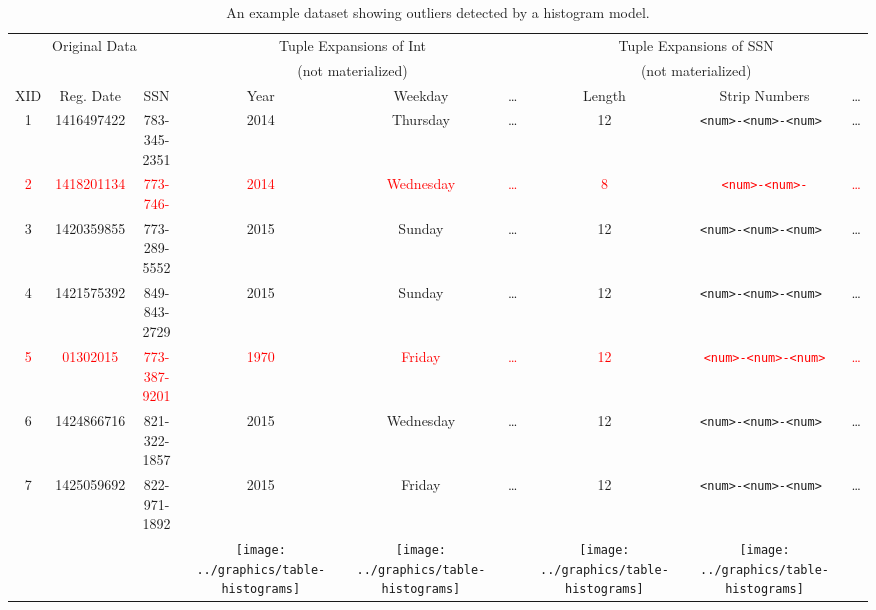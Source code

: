 \begin{table*}[t]
\begin{center}
\begin{tabular}{|c|c|c||c|c|c||c|c|c|}
\multicolumn{3}{c}{Original Data} & \multicolumn{3}{c}{Tuple Expansions of Int} & \multicolumn{3}{c}{Tuple Expansions of SSN} \\
\multicolumn{3}{c}{} & \multicolumn{3}{c}{(not materialized)} & \multicolumn{3}{c}{(not materialized)} \\
\hline
XID & Reg. Date & SSN & Year & Weekday & \ldots & Length & Strip Numbers & \ldots \\ \hline
\hline
1 & 1416497422 & 783-345-2351 & 2014 & Thursday &\ldots& 12 & \texttt{<num>-<num>-<num> }&\ldots  \\ \hline
\textcolor{red}{2} &\textcolor{red}{1418201134}&\textcolor{red}{773-746-}&\textcolor{red}{2014 }&\textcolor{red}{ Wednesday }&\textcolor{red}{\ldots}&\textcolor{red}{8}&\textcolor{red}{\texttt{<num>-<num>-}}&\textcolor{red}{\ldots}  \\ \hline
3 & 1420359855 & 773-289-5552 & 2015 & Sunday &\ldots& 12 & \texttt{<num>-<num>-<num> }&\ldots  \\ \hline
4 & 1421575392 & 849-843-2729 & 2015 & Sunday &\ldots& 12 & \texttt{<num>-<num>-<num> }&  \ldots\\ \hline
\textcolor{red}{5}&\textcolor{red}{01302015}&\textcolor{red}{773-387-9201}&\textcolor{red}{1970}&\textcolor{red}{Friday}&\textcolor{red}{\ldots}&\textcolor{red}{12}&\textcolor{red}{\texttt{<num>-<num>-<num>}}&\textcolor{red}{\ldots}\\ \hline
6 & 1424866716 & 821-322-1857 & 2015 & Wednesday &\ldots& 12 & \texttt{<num>-<num>-<num> }&  \ldots\\ \hline
7 & 1425059692 & 822-971-1892 & 2015 & Friday &\ldots& 12 & \texttt{<num>-<num>-<num> }&  \ldots\\ \hline
\multicolumn{3}{c}{} & \multicolumn{1}{c}{\texttt{[image: ../graphics/table-histograms]}} &\multicolumn{1}{c}{ \texttt{[image: ../graphics/table-histograms]}} &\multicolumn{1}{c}{}&\multicolumn{1}{c}{\texttt{[image: ../graphics/table-histograms]} }& \multicolumn{1}{c}{\texttt{[image: ../graphics/table-histograms]}} & \multicolumn{1}{c}{}
\end{tabular}
\end{center}

\caption{An example dataset showing outliers detected by a histogram model.}
\label{tab:example}
\end{table*}
